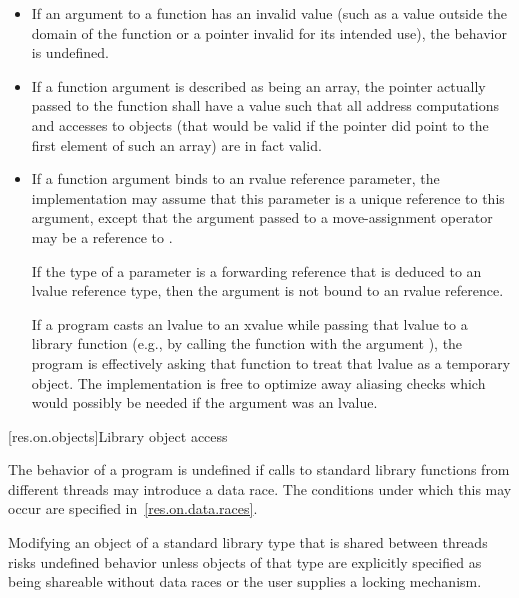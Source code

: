 \begin{itemize}
\item
If an argument to a function has an invalid value (such
%
as a value outside the domain of the function or a pointer invalid for its
intended use), the behavior is undefined.
%

\item
If a function argument is described as being an array,
%
the pointer actually passed to the function shall have a value such that all
address computations and accesses to objects (that would be valid if the
pointer did point to the first element of such an array) are in fact valid.

\item
If a function argument binds to an rvalue reference parameter, the implementation may
assume that this parameter is a unique reference to this argument,
except that the argument passed to a move-assignment operator may be
a reference to .
\begin{note}
If the type of a parameter is a forwarding reference
that is deduced to an lvalue reference type, then
the argument is not bound to an rvalue reference.
\end{note}
\begin{note}
If a program casts
an lvalue to an xvalue while passing that lvalue to a library function
(e.g., by calling the function with the argument ), the program
is effectively asking that function to treat that lvalue as a temporary object.
The implementation
is free to optimize away aliasing checks which would possibly be needed if the argument was
an lvalue.
\end{note}
\end{itemize}

[res.on.objects]{Library object access}

\pnum
The behavior of a program is undefined if calls to standard library functions from different
threads may introduce a data race. The conditions under which this may occur are specified
in~\ref{res.on.data.races}.
\begin{note}
Modifying an object of a standard library type that is
shared between threads risks undefined behavior unless objects of that type are explicitly
specified as being shareable without data races or the user supplies a locking mechanism.
\end{note}

